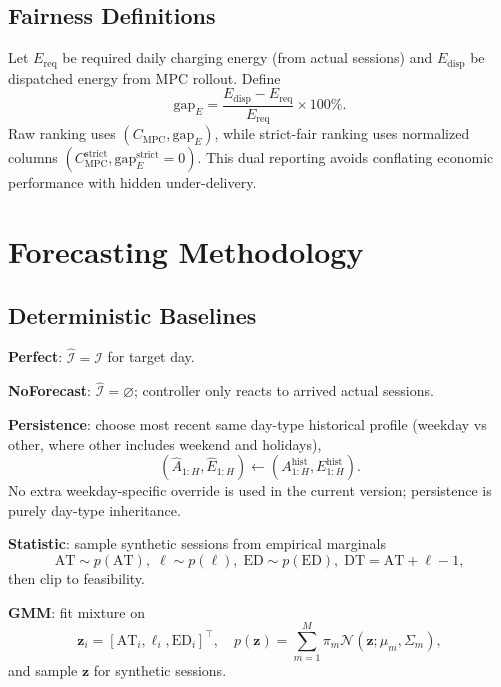\documentclass[journal]{IEEEtran}
\newcommand{\AT}{\mathrm{AT}}
\newcommand{\DT}{\mathrm{DT}}
\newcommand{\ED}{\mathrm{ED}}
\begin{document}
\subsection{Fairness Definitions}
Let $E_{\mathrm{req}}$ be required daily charging energy (from actual sessions) and $E_{\mathrm{disp}}$ be dispatched energy from MPC rollout. Define
\begin{equation}
\mathrm{gap}_E = \frac{E_{\mathrm{disp}}-E_{\mathrm{req}}}{E_{\mathrm{req}}}\times 100\%.
\end{equation}
Raw ranking uses $(C_{\mathrm{MPC}},\mathrm{gap}_E)$, while strict-fair ranking uses normalized columns $(C_{\mathrm{MPC}}^{\mathrm{strict}},\mathrm{gap}_E^{\mathrm{strict}}=0)$. This dual reporting avoids conflating economic performance with hidden under-delivery.

\section{Forecasting Methodology}

\subsection{Deterministic Baselines}
\textbf{Perfect}: $\hat{\mathcal{I}}=\mathcal{I}$ for target day.

\textbf{NoForecast}: $\hat{\mathcal{I}}=\varnothing$; controller only reacts to arrived actual sessions.

\textbf{Persistence}: choose most recent same day-type historical profile (weekday vs other, where other includes weekend and holidays),
\begin{equation}
(\hat{A}_{1:H},\hat{E}_{1:H}) \leftarrow (A^{\mathrm{hist}}_{1:H},E^{\mathrm{hist}}_{1:H}).
\end{equation}
No extra weekday-specific override is used in the current version; persistence is purely day-type inheritance.

\textbf{Statistic}: sample synthetic sessions from empirical marginals
\begin{equation}
\AT \sim p(\AT),\;\ell\sim p(\ell),\;\ED\sim p(\ED),\;\DT=\AT+\ell-1,
\end{equation}
then clip to feasibility.

\textbf{GMM}: fit mixture on
\begin{equation}
\mathbf{z}_i=[\AT_i,\ell_i,\ED_i]^\top,
\quad p(\mathbf{z})=\sum_{m=1}^{M}\pi_m\mathcal{N}(\mathbf{z};\mu_m,\Sigma_m),
\end{equation}
and sample $\mathbf{z}$ for synthetic sessions.
\end{document}
